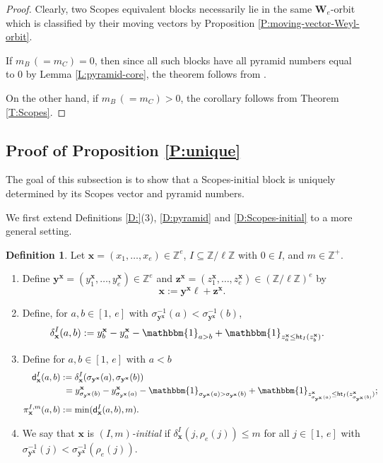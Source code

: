 \documentclass[11pt,a4paper,reqno]{amsart}
\numberwithin{equation}{section}
\theoremstyle{plain}
\theoremstyle{definition}
\newtheorem{Def}[thm]{Definition}
\theoremstyle{remark}
\numberwithin{equation}{section}
\newcommand{\bbone}{\mathbbm{1}}
\newcommand{\bx}{\mathbf{x}}
\newcommand{\by}{\mathbf{y}}
\newcommand{\bz}{\mathbf{z}}
\renewcommand{\min}{\mathrm{min}}
\newcommand{\ZZ}{\mathbb{Z}}
\newcommand{\rr}{\rho}
\newcommand{\AW}{\mathbf{W}}
\newcommand{\Ht}{\mathsf{ht}}
\newcommand{\dd}{\mathsf{d}}
\begin{document}
\begin{proof}
Clearly, two Scopes equivalent blocks necessarily lie in the same $\AW_e$-orbit which is classified by their moving vectors by Proposition \ref{P:moving-vector-Weyl-orbit}.

If $m_B\, (= m_C) = 0$, then since all such blocks have all pyramid numbers equal to $0$ by Lemma \ref{L:pyramid-core}, the theorem follows from \cite[Theorem 4.24]{LQT}.

On the other hand, if $m_B\, (= m_C) >0$, the corollary follows from Theorem \ref{T:Scopes}.
\end{proof}

\subsection{Proof of Proposition \ref{P:unique}}

The goal of this subsection is to show that a Scopes-initial block is uniquely determined by its Scopes vector and pyramid numbers.

We first extend Definitions \ref{D:}(3), \ref{D:pyramid} and \ref{D:Scopes-initial} to a more general setting.

\begin{Def}
Let $\bx = (x_1,\dotsc, x_e) \in \ZZ^e$,  $I \subseteq \ZZ/\ell\ZZ$ with $0 \in I$, and $m \in \ZZ^+$.
\begin{enumerate}
\item Define $\by^{\bx} = (y^{\bx}_1, \dotsc, y^{\bx}_e) \in \ZZ^e$ and $\bz^{\bx} = (z^{\bx}_1,\dotsc, z^{\bx}_e) \in (\ZZ/\ell\ZZ)^e$ by
$$
\bx := \by^{\bx} \ell + \bz^{\bx}.
$$

\item Define, for $a,b \in [1,\,e]$ with $\sigma_{\by^{\bx}}^{-1}(a) < \sigma_{\by^{\bx}}^{-1}(b)$,
\begin{align*}
\delta_{\bx}^I(a,b) &:= y^{\bx}_{b} - y^{\bx}_{a} - \bbone_{a > b} + \bbone_{z^{\bx}_a \leq \Ht_I(z^{\bx}_b)}.
\end{align*}

\item Define for $a,b \in [1,\,e]$ with $a  < b$
\begin{align*}
\dd_{\bx}^I (a,b) &:= \delta_{\bx}^I(\sigma_{\by^{\bx}}(a),\sigma_{\by^{\bx}}(b)) \\
&\ =  y^{\bx}_{\sigma_{\by^{\bx}}(b)} - y^{\bx}_{\sigma_{\by^{\bx}}(a)} - \bbone_{\sigma_{\by^{\bx}}(a) >\sigma_{\by^{\bx}}(b)} + \bbone_{z^{\bx}_{\sigma_{\by^{\bx}}(a)} \leq \Ht_I(z^{\bx}_{\sigma_{\by^{\bx}}(b)})}; \\
\pi_{\bx}^{I,m} (a,b) &:= \min(\dd_{\bx}^I(a,b),m).
\end{align*}

\item We say that $\bx$ is {\em $(I,m)$-initial} if $\delta_{\bx}^I(j, \rr_e(j)) \leq m$ for all $j \in [1,\,e]$ with  $\sigma_{\by^{\bx}}^{-1}(j) < \sigma_{\by^{\bx}}^{-1}(\rr_e(j))$.
\end{enumerate}
\end{Def}
\end{document}
